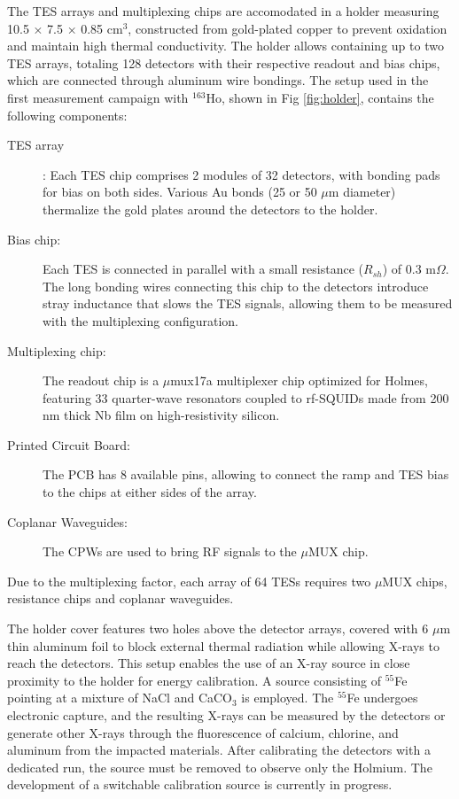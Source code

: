 The TES arrays and multiplexing chips are accomodated in a holder measuring 10.5 × 7.5 × 0.85 cm$^3$, constructed from
gold-plated copper to prevent oxidation and maintain high thermal conductivity. The holder allows containing up to two
TES arrays, totaling 128 detectors with their respective readout and bias chips, which are connected through aluminum wire bondings.
The setup used in the first measurement campaign with $^{163}$Ho, shown in Fig \ref{fig:holder}, contains the following components:
\begin{description}

\item[TES array]: Each TES chip comprises 2 modules of 32 detectors,
  with bonding pads for bias on both sides. Various Au bonds (25 or 50 $\mu$m diameter) thermalize the gold plates around the detectors to the holder.
  
\item[Bias chip:] Each TES is connected in parallel with a small resistance ($R_{sh}$) of 0.3 m$\Omega$. The long bonding
  wires connecting this chip to the detectors introduce stray inductance that slows the TES signals, allowing them to
  be measured with the multiplexing configuration.


\item[Multiplexing chip:] The readout chip is a $\mu$mux17a multiplexer chip optimized for Holmes, featuring 33
  quarter-wave resonators coupled to rf-SQUIDs made from 200 nm thick Nb film on high-resistivity silicon. 

\item[Printed Circuit Board:] The PCB has 8 available pins, allowing to connect the ramp and TES bias to the chips at either sides of the array.

 \item[Coplanar Waveguides:] The CPWs are used to bring RF signals to the $\mu$MUX chip.
\end{description}
Due to the multiplexing factor, each array of 64 TESs requires two $\mu$MUX chips, resistance chips and coplanar waveguides. 

The holder cover features two holes above the detector arrays, covered with 6 $\mu$m thin aluminum foil to block external
thermal radiation while allowing X-rays to reach the detectors. This setup enables the use of an X-ray source in close
proximity to the holder for energy calibration. A source consisting of \(^{55}\)Fe pointing at a mixture of NaCl and
CaCO\(_3\) is employed. The \(^{55}\)Fe undergoes electronic capture, and the resulting X-rays can be measured by the
detectors or generate other X-rays through the fluorescence of calcium, chlorine, and aluminum from the impacted
materials. After calibrating the detectors with a dedicated run, the source must be removed to observe only the Holmium. The development of a switchable calibration source is currently in progress.


